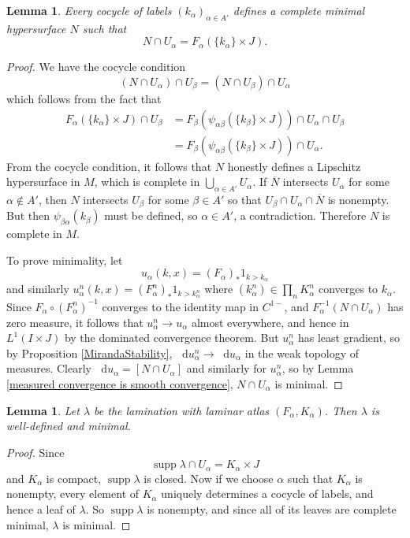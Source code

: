 \documentclass[reqno,11pt]{amsart}
\newcommand*\dif{\mathop{}\!\mathrm{d}}
\DeclareMathOperator{\supp}{supp}
\newtheorem{lemma}[theorem]{Lemma}
\theoremstyle{definition}
\numberwithin{equation}{section}
\begin{document}
\begin{lemma}
	Every cocycle of labels $(k_\alpha)_{\alpha \in A'}$ defines a complete minimal hypersurface $N$ such that
	$$N \cap U_\alpha = F_\alpha(\{k_\alpha\} \times J).$$
\end{lemma}
\begin{proof}
We have the cocycle condition
$$(N \cap U_\alpha) \cap U_\beta = (N \cap U_\beta) \cap U_\alpha$$
which follows from the fact that
\begin{align*}
F_\alpha(\{k_\alpha\} \times J) \cap U_\beta
&= F_\beta(\psi_{\alpha \beta}(\{k_\beta\} \times J)) \cap U_\alpha \cap U_\beta \\
&= F_\beta(\psi_{\alpha \beta}(\{k_\beta\} \times J)) \cap U_\alpha.
\end{align*}
From the cocycle condition, it follows that $N$ honestly defines a Lipschitz hypersurface in $M$, which is complete in $\bigcup_{\alpha \in A'} U_\alpha$.
If $\overline N$ intersects $U_\alpha$ for some $\alpha \notin A'$, then $N$ intersects $U_\beta$ for some $\beta \in A'$ so that $U_\beta \cap U_\alpha \cap \overline N$ is nonempty.
But then $\psi_{\beta \alpha}(k_\beta)$ must be defined, so $\alpha \in A'$, a contradiction.
Therefore $N$ is complete in $M$.

To prove minimality, let
$$u_\alpha(k, x) = (F_\alpha)_* 1_{k > k_\alpha}$$
and similarly $u_\alpha^n(k, x) = (F_\alpha^n)_* 1_{k > k_\alpha^n}$ where $(k_\alpha^n) \in \prod_n K_\alpha^n$ converges to $k_\alpha$.
Since $F_\alpha \circ (F_\alpha^n)^{-1}$ converges to the identity map in $C^{1-}$, and $F_\alpha^{-1}(N \cap U_\alpha)$ has zero measure, it follows that $u_\alpha^n \to u_\alpha$ almost everywhere, and hence in $L^1(I \times J)$ by the dominated convergence theorem.
But $u_\alpha^n$ has least gradient, so by Proposition \ref{MirandaStability}, $\dif u_\alpha^n \to \dif u_\alpha$ in the weak topology of measures.
Clearly $\dif u_\alpha = [N \cap U_\alpha]$ and similarly for $u_\alpha^n$, so by Lemma \ref{measured convergence is smooth convergence}, $N \cap U_\alpha$ is minimal.
\end{proof}

\begin{lemma}
	Let $\lambda$ be the lamination with laminar atlas $(F_\alpha, K_\alpha)$.
	Then $\lambda$ is well-defined and minimal.
\end{lemma}
\begin{proof}
Since 
$$\supp \lambda \cap U_\alpha = K_\alpha \times J$$
and $K_\alpha$ is compact, $\supp \lambda$ is closed.
Now if we choose $\alpha$ such that $K_\alpha$ is nonempty, every element of $K_\alpha$ uniquely determines a cocycle of labels, and hence a leaf of $\lambda$.
So $\supp \lambda$ is nonempty, and since all of its leaves are complete minimal, $\lambda$ is minimal.
\end{proof}
\end{document}
